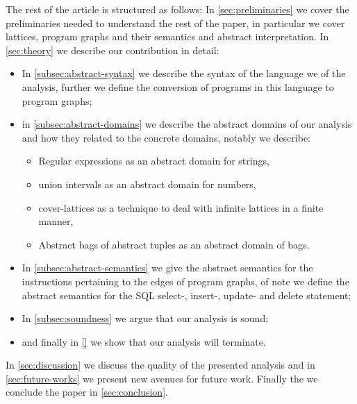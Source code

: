 The rest of the article is structured as follows:
In \autoref{sec:preliminaries} we cover the preliminaries needed to understand the rest of the paper, in particular we cover lattices, program graphs and their semantics and abstract interpretation.
In \autoref{sec:theory} we describe our contribution in detail:
\begin{itemize}
    \item In \autoref{subsec:abstract-syntax} we describe the syntax of the language we of the analysis, further we define the conversion of programs in this language to program graphs;
    \item in \autoref{subsec:abstract-domains} we describe the abstract domains of our analysis and how they related to the concrete domains, notably we describe:
    \begin{itemize}
        \item Regular expressions as an abstract domain for strings,
        \item union intervals as an abstract domain for numbers,
        \item cover-lattices as a technique to deal with infinite lattices in a finite manner,
        \item Abstract bags of abstract tuples as an abstract domain of bags.
    \end{itemize}
    \item In \autoref{subsec:abstract-semantics} we give the abstract semantics for the instructions pertaining to the edges of program graphs, of note we define the abstract semantics for the SQL select-, insert-, update- and delete statement;
    \item In \autoref{subsec:soundness} we argue that our analysis is sound;
    \item and finally in \autoref{} we show that our analysis will terminate.
\end{itemize}
In \autoref{sec:discussion} we discuss the quality of the presented analysis and in \autoref{sec:future-works} we present new avenues for future work.
Finally the we conclude the paper in \autoref{sec:conclusion}.



